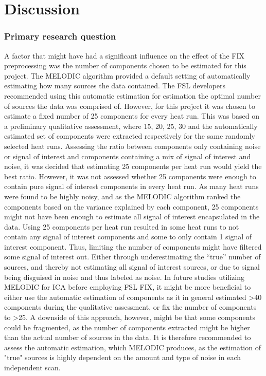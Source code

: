 \chapter{Discussion}
\subsection*{Primary research question} 
A factor that might have had a significant influence on the effect of the FIX preprocessing was the number of components chosen to be estimated for this project. The MELODIC algorithm provided a default setting of automatically estimating how many sources the data contained. The FSL developers recommended using this automatic estimation for estimation the optimal number of sources the data was comprised of. However, for this project it was chosen to estimate a fixed number of 25 components for every heat run. This was based on a preliminary qualitative assessment, where 15, 20, 25, 30 and the automatically estimated set of components were extracted respectively for the same randomly selected heat runs. Assessing the ratio between components only containing noise or signal of interest and components containing a mix of signal of interest and noise, it was decided that estimating 25 components per heat run would yield the best ratio. However, it was not assessed whether 25 components were enough to contain pure signal of interest components in every heat run. As many heat runs were found to be highly noisy, and as the MELODIC algorithm ranked the components based on the variance explained by each component, 25 components might not have been enough to estimate all signal of interest encapsulated in the data. Using 25 components per heat run resulted in some heat runs to not contain any signal of interest components and some to only contain 1 signal of interest component. Thus, limiting the number of components might have filtered some signal of interest out. Either through underestimating the “true” number of sources, and thereby not estimating all signal of interest sources, or due to signal being disguised in noise and thus labeled as noise. In future studies utilizing MELODIC for ICA before employing FSL FIX, it might be more beneficial to either use the automatic estimation of components as it in general estimated >40 components during the qualitative assessment, or fix the number of components to >25. A downside of this approach, however, might be that some components could be fragmented, as the number of components extracted might be higher than the actual number of sources in the data. It is therefore recommended to assess the automatic estimation, which MELODIC produces, as the estimation of "true" sources is highly dependent on the amount and type of noise in each independent scan. \\

